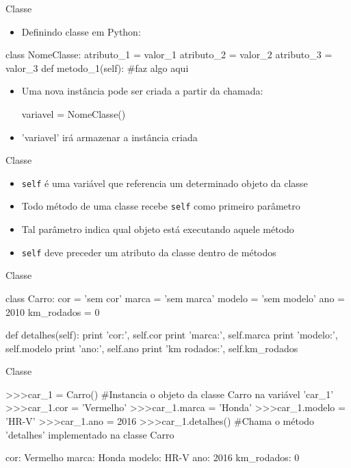 \documentclass{beamer}
\begin{document}
\begin{frame}[fragile]{Classe}
    \begin{itemize}
        \item Definindo classe em Python:
    \end{itemize}
    \begin{semiverbatim}
        class NomeClasse:
            atributo_1 = valor_1
            atributo_2 = valor_2
            atributo_3 = valor_3
        def metodo_1(self):
            #faz algo aqui
    \end{semiverbatim}
    \begin{itemize}
        \item Uma nova instância pode ser criada a partir da chamada:
        \begin{semiverbatim}
            variavel = NomeClasse()
        \end{semiverbatim}
        \item 'variavel' irá armazenar a instância criada
    \end{itemize}
\end{frame}

\begin{frame}{Classe}
    \begin{itemize}
        \item \texttt{self} é uma variável que referencia um determinado objeto da classe
        \item Todo método de uma classe recebe \texttt{self} como primeiro parâmetro
        \item Tal parâmetro indica qual objeto está executando aquele método
        \item \texttt{self} deve preceder um atributo da classe dentro de métodos
    \end{itemize}
\end{frame}

\begin{frame}[fragile]{Classe}
\small
\begin{semiverbatim}
class Carro:
    cor = 'sem cor'
    marca = 'sem marca'
    modelo = 'sem modelo'
    ano = 2010
    km_rodados = 0

    def detalhes(self):
        print 'cor:', self.cor
        print 'marca:', self.marca
        print 'modelo:', self.modelo
        print 'ano:', self.ano
        print 'km rodados:', self.km_rodados
\end{semiverbatim}
\end{frame}

\begin{frame}[fragile]{Classe}
\scriptsize
\begin{semiverbatim}
>>>car_1 = Carro() #Instancia o objeto da classe Carro na variável 'car_1'
>>>car_1.cor = 'Vermelho'
>>>car_1.marca = 'Honda'
>>>car_1.modelo = 'HR-V'
>>>car_1.ano = 2016
>>>car_1.detalhes() #Chama o método 'detalhes' implementado na classe Carro

cor: Vermelho
marca: Honda
modelo: HR-V
ano: 2016
km_rodados: 0
\end{semiverbatim}
\end{frame}
\end{document}
